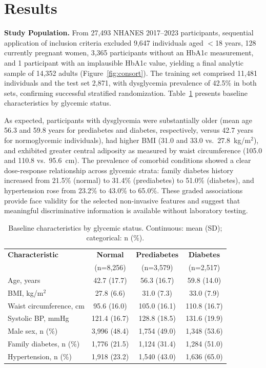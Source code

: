 \documentclass{amia}
\begin{document}
\section*{Results}

\textbf{Study Population.}
From 27,493 NHANES 2017--2023 participants, sequential application of inclusion criteria excluded 9,647 individuals aged $<$18 years, 128 currently pregnant women, 3,365 participants without an HbA1c measurement, and 1 participant with an implausible HbA1c value, yielding a final analytic sample of 14,352 adults (Figure~\ref{fig:consort}). The training set comprised 11,481 individuals and the test set 2,871, with dysglycemia prevalence of 42.5\% in both sets, confirming successful stratified randomization. Table~\ref{tab:baseline} presents baseline characteristics by glycemic status.

As expected, participants with dysglycemia were substantially older (mean age 56.3 and 59.8 years for prediabetes and diabetes, respectively, versus 42.7 years for normoglycemic individuals), had higher BMI (31.0 and 33.0 vs.\ 27.8~kg/m$^2$), and exhibited greater central adiposity as measured by waist circumference (105.0 and 110.8 vs.\ 95.6~cm). The prevalence of comorbid conditions showed a clear dose-response relationship across glycemic strata: family diabetes history increased from 21.5\% (normal) to 31.4\% (prediabetes) to 51.0\% (diabetes), and hypertension rose from 23.2\% to 43.0\% to 65.0\%. These graded associations provide face validity for the selected non-invasive features and suggest that meaningful discriminative information is available without laboratory testing.

\begin{table}[H]
\caption{Baseline characteristics by glycemic status. Continuous: mean (SD); categorical: n (\%).}
\label{tab:baseline}
\begin{center}
\small
\begin{tabular}{lccc}
\toprule
\textbf{Characteristic} & \textbf{Normal} & \textbf{Prediabetes} & \textbf{Diabetes} \\
 & (n=8,256) & (n=3,579) & (n=2,517) \\
\midrule
Age, years & 42.7 (17.7) & 56.3 (16.7) & 59.8 (14.0) \\
BMI, kg/m$^2$ & 27.8 (6.6) & 31.0 (7.3) & 33.0 (7.9) \\
Waist circumference, cm & 95.6 (16.0) & 105.0 (16.1) & 110.8 (16.7) \\
Systolic BP, mmHg & 121.4 (16.7) & 128.8 (18.5) & 131.6 (19.9) \\
Male sex, n (\%) & 3,996 (48.4) & 1,754 (49.0) & 1,348 (53.6) \\
Family diabetes, n (\%) & 1,776 (21.5) & 1,124 (31.4) & 1,284 (51.0) \\
Hypertension, n (\%) & 1,918 (23.2) & 1,540 (43.0) & 1,636 (65.0) \\
\bottomrule
\end{tabular}
\end{center}
\end{table}
\end{document}
